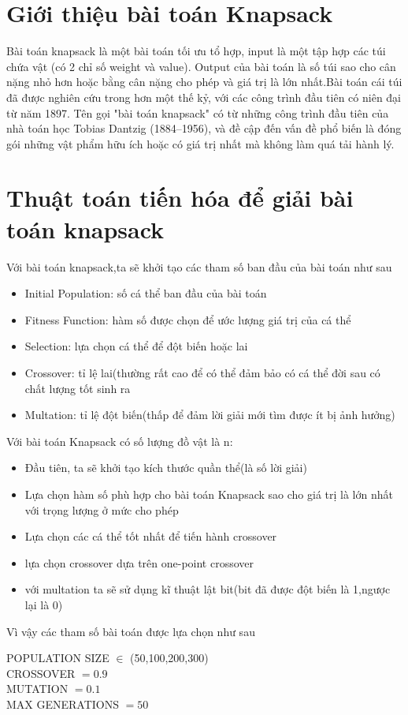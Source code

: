 \documentclass{article}
\begin{document}
\section{Giới thiệu bài toán Knapsack}
Bài toán knapsack là một bài toán tối ưu tổ hợp, input là một tập hợp các túi chứa vật (có 2 chỉ số weight và value). Output của bài toán là số túi sao cho cân nặng nhỏ hơn hoặc bằng cân nặng cho phép và giá trị là lớn nhất.Bài toán cái túi đã được nghiên cứu trong hơn một thế kỷ, với các công trình đầu tiên có niên đại từ năm 1897. Tên gọi "bài toán knapsack" có từ những công trình đầu tiên của nhà toán học Tobias Dantzig (1884–1956), và đề cập đến vấn đề phổ biến là đóng gói những vật phẩm hữu ích hoặc có giá trị nhất mà không làm quá tải hành lý.
\section{Thuật toán tiến hóa để giải bài toán knapsack}
Với bài toán knapsack,ta sẽ khởi tạo các tham số ban đầu của bài toán như sau
\begin{itemize}
    \item Initial Population: số cá thể ban đầu của bài toán
    \item Fitness Function: hàm số được chọn để ước lượng giá trị của cá thể
    \item Selection: lựa chọn cá thể để đột biến hoặc lai
    \item Crossover: tỉ lệ lai(thường rất cao để có thể đảm bảo có cá thể  đời sau có chất lượng tốt sinh ra
    \item Multation: tỉ lệ đột biến(thấp để đảm lời giải mới tìm được ít bị ảnh hưởng)
\end{itemize}
Với bài toán Knapsack có số lượng đồ vật là n:
\begin{itemize}
    \item Đầu tiên, ta sẽ khởi tạo kích thước quần thể(là số lời giải)
    \item Lựa chọn hàm số phù hợp cho bài toán Knapsack sao cho giá trị là lớn nhất với trọng lượng ở mức cho phép
    \item Lựa chọn các cá thể tốt nhất để tiến hành crossover
    \item lựa chọn crossover dựa trên one-point crossover
    \item với multation ta sẽ sử dụng kĩ thuật lật bit(bit đã được đột biến là 1,ngược lại là 0) 
\end{itemize}
Vì vậy các tham số bài toán được lựa chọn như sau
\begin{center}
        POPULATION SIZE $ \in$ (50,100,200,300)\\
        CROSSOVER $= 0.9$ \\
        MUTATION $= 0.1$   \\
        MAX GENERATIONS $= 50$
    \end{center}
\end{document}
